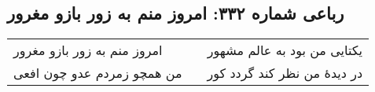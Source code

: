 \begin{center}
\section*{رباعی شماره ۳۳۲: امروز منم به زور بازو مغرور}
\label{sec:sh332}
\begin{longtable}{l p{0.5cm} r}
امروز منم به زور بازو مغرور
&&
یکتایی من بود به عالم مشهور
\\
من همچو زمردم عدو چون افعی
&&
در دیدهٔ من نظر کند گردد کور
\\
\end{longtable}
\end{center}
